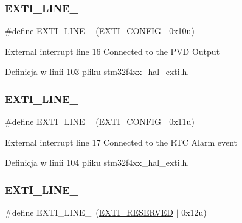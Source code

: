\subsubsection{\texorpdfstring{E\+X\+T\+I\+\_\+\+L\+I\+N\+E\+\_}{EXTI\_LINE\_16}}
{\footnotesize\ttfamily \#define E\+X\+T\+I\+\_\+\+L\+I\+N\+E\+\_~(\hyperlink{group___e_x_t_i___private___constants_ga6f245ca02e17c1798fe43a66ea5b7fa4}{E\+X\+T\+I\+\_\+\+C\+O\+N\+F\+IG}     $\vert$ 0x10u)}

External interrupt line 16 Connected to the P\+VD Output 

Definicja w linii 103 pliku stm32f4xx\+\_\+hal\+\_\+exti.\+h.

\mbox{\label{group___e_x_t_i___line_ga9d09e51fda52def20bd23a0c42da3014}} 
\subsubsection{\texorpdfstring{E\+X\+T\+I\+\_\+\+L\+I\+N\+E\+\_}{EXTI\_LINE\_17}}
{\footnotesize\ttfamily \#define E\+X\+T\+I\+\_\+\+L\+I\+N\+E\+\_~(\hyperlink{group___e_x_t_i___private___constants_ga6f245ca02e17c1798fe43a66ea5b7fa4}{E\+X\+T\+I\+\_\+\+C\+O\+N\+F\+IG}     $\vert$ 0x11u)}

External interrupt line 17 Connected to the R\+TC Alarm event 

Definicja w linii 104 pliku stm32f4xx\+\_\+hal\+\_\+exti.\+h.

\mbox{\label{group___e_x_t_i___line_ga8f420801658edbe81973c670ed97913e}} 
\subsubsection{\texorpdfstring{E\+X\+T\+I\+\_\+\+L\+I\+N\+E\+\_}{EXTI\_LINE\_18}}
{\footnotesize\ttfamily \#define E\+X\+T\+I\+\_\+\+L\+I\+N\+E\+\_~(\hyperlink{group___e_x_t_i___private___constants_gac15c8e004a79171f659e6cba49e8a57a}{E\+X\+T\+I\+\_\+\+R\+E\+S\+E\+R\+V\+ED}   $\vert$ 0x12u)}

